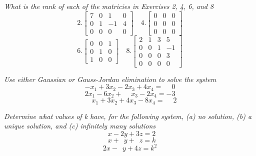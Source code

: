 \documentclass[11pt,letterpaper,boxed]{hmcpset}
\begin{document}


\pagebreak

\begin{problem}[2.2.23]
\textit{What is the rank of each of the matricies in Exercises 2, 4, 6, and 8}
$$ 2. \begin{bmatrix}
7&0&1&0\\0&1&-1&4\\0&0&0&0
\end{bmatrix}
\quad
4.\begin{bmatrix}
	0&0&0\\
	0&0&0\\
	0&0&0
\end{bmatrix}
$$
$$ 6.\begin{bmatrix}
	0&0&1\\
	0&1&0\\
	1&0&0
\end{bmatrix}
\quad
8.  \begin{bmatrix}
2&1&3&5\\0&0&1&-1\\0&0&0&3\\0&0&0&0
\end{bmatrix}
$$
\end{problem}



\pagebreak

\begin{problem}[2.2.30]
\textit{Use either Gaussian or Gauss-Jordan elimination to solve the system} 
$$ -x_1+3x_2-2x_3+4x_4 = \phantom-0$$
$$2x_1-6x_2+ \phantom-x_3-2x_4 = -3$$
$$ \phantom-x_1+3x_2+4x_3-8x_4 = \phantom-2$$
\end{problem}



\pagebreak

\begin{problem}[2.2.42]
\textit{Determine what values of k have, for the following system, (a) no solution, (b) a unique solution, and (c) infinitely many solutions}
$$ \phantom2 x - 2y+3z=2$$
$$ \phantom2 x +\phantom 2 y+\phantom3z = k$$
$$ 2x - \phantom2 y +4z= k^2$$ 
\end{problem}
\end{document}

